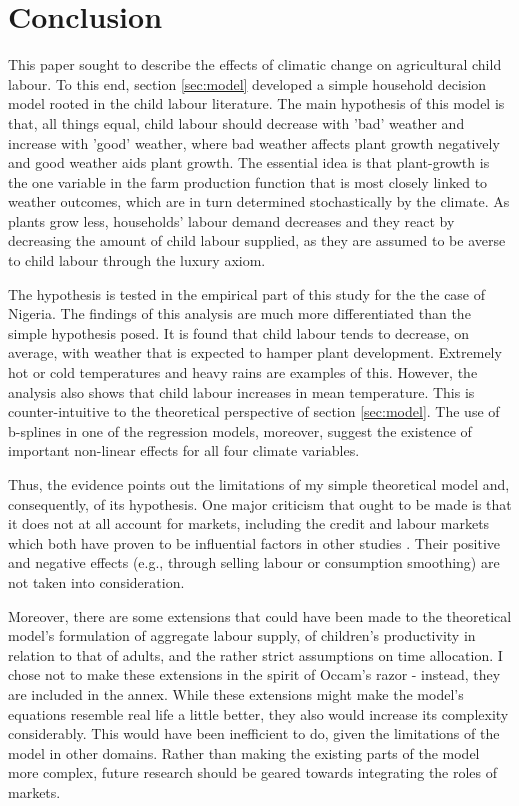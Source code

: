 \documentclass[a4paper,12pt]{article}
\theoremstyle{plain}
\theoremstyle{definition}
\theoremstyle{definition}
\theoremstyle{definition}
\theoremstyle{definition}
\begin{document}
\section{Conclusion}
\label{sec:conclusion}

This paper sought to describe the effects of climatic change on agricultural child labour. To this end, section \ref{sec:model} developed a simple household decision model rooted in the child labour literature. The main hypothesis of this model is that, all things equal, child labour should decrease with 'bad' weather and increase with 'good' weather, where bad weather affects plant growth negatively and good weather aids plant growth. The essential idea is that plant-growth is the one variable in the farm production function that is most closely linked to weather outcomes, which are in turn determined stochastically by the climate. As plants grow less, households' labour demand decreases and they react by decreasing the amount of child labour supplied, as they are assumed to be averse to child labour through the luxury axiom.

The hypothesis is tested in the empirical part of this study for the the case of Nigeria. The findings of this analysis are much more differentiated than the simple hypothesis posed. It is found that child labour tends to decrease, on average, with weather that is expected to hamper plant development. Extremely hot or cold temperatures and heavy rains are examples of this. However, the analysis also shows that child labour increases in mean temperature. This is counter-intuitive to the theoretical perspective of section \ref{sec:model}. The use of b-splines in one of the regression models, moreover, suggest the existence of important non-linear effects for all four climate variables.

Thus, the evidence points out the limitations of my simple theoretical model and, consequently, of its hypothesis. One major criticism that ought to be made is that it does not at all account for markets, including the credit and labour markets which both have proven to be influential factors in other studies \citep[e.g.,][]{Bhalotra2003,Dumas2013}. Their positive and negative effects (e.g., through selling labour or consumption smoothing) are not taken into consideration.

Moreover, there are some extensions that could have been made to the theoretical model's formulation of aggregate labour supply, of children's productivity in relation to that of adults, and the rather strict assumptions on time allocation. I chose not to make these extensions in the spirit of Occam's razor - instead, they are included in the annex. While these extensions might make the model's equations resemble real life a little better, they also would increase its complexity considerably. This would have been inefficient to do, given the limitations of the model in other domains. Rather than making the existing parts of the model more complex, future research should be geared towards integrating the roles of markets.  
\end{document}
